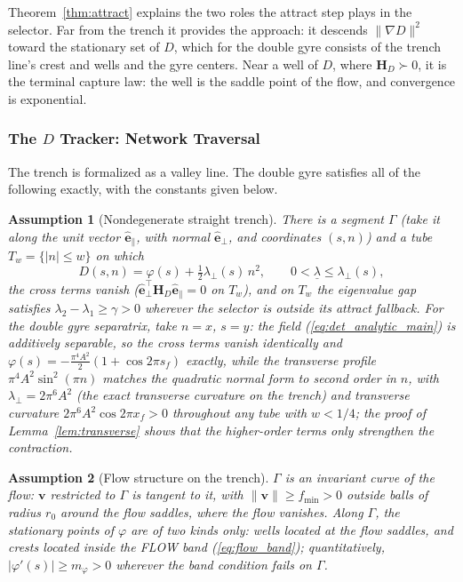 \documentclass[lettersize,journal]{IEEEtran}
\newtheorem{assumption}{Assumption}
\begin{document}
Theorem~\ref{thm:attract} explains the two roles the attract step plays
in the selector. Far from the trench it provides the approach: it descends
$\|\nabla D\|^2$ toward the stationary set of $D$, which for the double
gyre consists of the trench line's crest and wells and the gyre
centers. Near a well of $D$, where $\mathbf{H}_D \succ 0$, it is the
terminal capture law: the well is the saddle point of the flow, and
convergence is exponential.

\subsubsection{The $D$ Tracker: Network Traversal}
\label{sec:stab_sep}

The trench is formalized as a valley line. The double gyre satisfies all
of the following exactly, with the constants given below.

\begin{assumption}[Nondegenerate straight trench]
\label{ass:trench}
There is a segment $\Gamma$ (take it along the unit vector
$\hat{\mathbf{e}}_\parallel$, with normal $\hat{\mathbf{e}}_\perp$, and
coordinates $(s, n)$) and a tube $T_w = \{|n| \leq w\}$ on which
\begin{equation}
    D(s, n) = \varphi(s) + \tfrac{1}{2}\lambda_\perp(s)\,n^2,
    \qquad 0 < \underline{\lambda} \leq \lambda_\perp(s),
    \label{eq:normal_form}
\end{equation}
the cross terms vanish
($\hat{\mathbf{e}}_\perp^\top \mathbf{H}_D \hat{\mathbf{e}}_\parallel
= 0$ on $T_w$), and on $T_w$ the eigenvalue gap satisfies
$\lambda_2 - \lambda_1 \geq \gamma > 0$ wherever the selector is
outside its attract fallback. For the double gyre separatrix, take
$n = x$, $s = y$: the field (\ref{eq:det_analytic_main}) is additively
separable, so the cross terms vanish identically and $\varphi(s) =
-\tfrac{\pi^4 A^2}{2}(1 + \cos 2\pi s_f)$ exactly, while the transverse
profile $\pi^4 A^2 \sin^2(\pi n)$ matches the quadratic normal form to
second order in $n$, with $\lambda_\perp = 2\pi^6 A^2$ (the exact
transverse curvature on the trench) and transverse curvature
$2\pi^6 A^2 \cos 2\pi x_f > 0$ throughout any tube with $w < 1/4$; the
proof of Lemma~\ref{lem:transverse} shows that the higher-order terms
only strengthen the contraction.
\end{assumption}

\begin{assumption}[Flow structure on the trench]
\label{ass:flow}
$\Gamma$ is an invariant curve of the flow: $\mathbf{v}$ restricted to
$\Gamma$ is tangent to it, with $\|\mathbf{v}\| \geq f_{\min} > 0$
outside balls of radius $r_0$ around the flow saddles, where the flow
vanishes. Along $\Gamma$, the stationary points of $\varphi$ are of two
kinds only: wells located at the flow saddles, and crests located inside
the FLOW band (\ref{eq:flow_band}); quantitatively, $|\varphi'(s)| \geq
m_\varphi > 0$ wherever the band condition fails on $\Gamma$.
\end{assumption}
\end{document}
